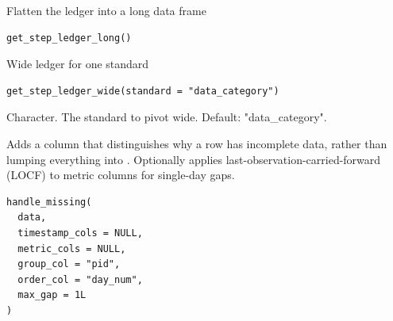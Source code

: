 \documentclass[a4paper]{book}
\begin{document}
%
\begin{Examples}
\end{Examples}
%
\begin{Description}
Flatten the ledger into a long data frame
\end{Description}
%
\begin{Usage}
\begin{verbatim}
get_step_ledger_long()
\end{verbatim}
\end{Usage}
%
\begin{Description}
Wide ledger for one standard
\end{Description}
%
\begin{Usage}
\begin{verbatim}
get_step_ledger_wide(standard = "data_category")
\end{verbatim}
\end{Usage}
%
\begin{Arguments}
\begin{ldescription}
\item[\code{standard}] Character. The standard to pivot wide. Default: "data\_category".
\end{ldescription}
\end{Arguments}
%
\begin{Description}
Adds a  column that distinguishes why a row has
incomplete data, rather than lumping everything into .
Optionally applies last-observation-carried-forward (LOCF) to metric
columns for single-day gaps.
\end{Description}
%
\begin{Usage}
\begin{verbatim}
handle_missing(
  data,
  timestamp_cols = NULL,
  metric_cols = NULL,
  group_col = "pid",
  order_col = "day_num",
  max_gap = 1L
)
\end{verbatim}
\end{Usage}
\end{document}
